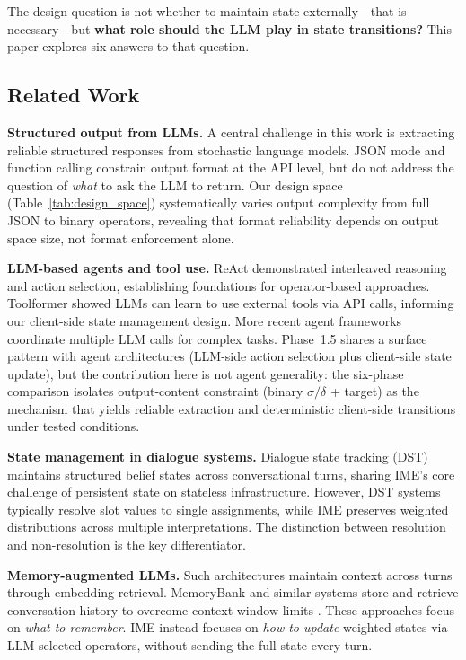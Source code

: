\documentclass[11pt,a4paper]{article}
\begin{document}
The design question is not whether to maintain state externally---that is
necessary---but \textbf{what role should the LLM play in state transitions?}
This paper explores six answers to that question.

\subsection{Related Work}

\textbf{Structured output from LLMs.}
A central challenge in this work is extracting reliable structured responses from
stochastic language models. JSON mode and function calling
\cite{openai2024structured} constrain output format at the API level, but do not
address the question of \textit{what} to ask the LLM to return. Our design space
(Table~\ref{tab:design_space}) systematically varies output complexity from full
JSON to binary operators, revealing that format reliability depends on output
space size, not format enforcement alone.

\textbf{LLM-based agents and tool use.}
ReAct \cite{yao2023react} demonstrated interleaved reasoning and action selection,
establishing foundations for operator-based approaches. Toolformer
\cite{schick2023toolformer} showed LLMs can learn to use external tools via API
calls, informing our client-side state management design. More recent agent
frameworks \cite{wang2024survey} coordinate multiple LLM calls for complex tasks.
Phase~1.5 shares a surface pattern with agent architectures (LLM-side action
selection plus client-side state update), but the contribution here is not
agent generality: the six-phase comparison isolates output-content constraint
(binary $\sigma/\delta$ + target) as the mechanism that yields reliable
extraction and deterministic client-side transitions under tested conditions.

\textbf{State management in dialogue systems.}
Dialogue state tracking (DST) \cite{budzianowski2018multiwoz} maintains structured
belief states across conversational turns, sharing IME's core challenge of
persistent state on stateless infrastructure. However, DST systems typically
resolve slot values to single assignments, while IME preserves weighted
distributions across multiple interpretations. The distinction between resolution
and non-resolution is the key differentiator.

\textbf{Memory-augmented LLMs.}
Such architectures \cite{wu2022memorizing} maintain context across
turns through embedding retrieval. MemoryBank and similar systems store and
retrieve conversation history to overcome context window limits
\cite{zhong2024memorybank}. These approaches focus on \textit{what to remember}.
IME instead focuses on \textit{how to update} weighted states via
LLM-selected operators, without sending the full state every turn.
\end{document}
